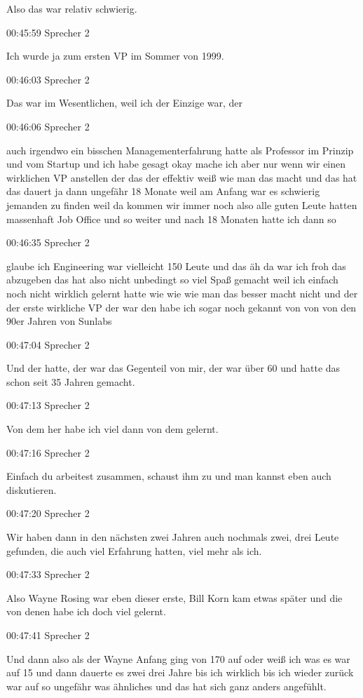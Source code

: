 Also das war relativ schwierig.

00:45:59 Sprecher 2

Ich wurde ja zum ersten VP im Sommer von 1999.

00:46:03 Sprecher 2

Das war im Wesentlichen, weil ich der Einzige war, der

00:46:06 Sprecher 2

auch irgendwo ein bisschen Managementerfahrung hatte als Professor im
Prinzip und vom Startup und ich habe gesagt okay mache ich aber nur wenn
wir einen wirklichen VP anstellen der das der effektiv weiß wie man das
macht und das hat das dauert ja dann ungefähr 18 Monate weil am Anfang
war es schwierig jemanden zu finden weil da kommen wir immer noch also
alle guten Leute hatten massenhaft Job Office und so weiter und nach 18
Monaten hatte ich dann so

00:46:35 Sprecher 2

glaube ich Engineering war vielleicht 150 Leute und das äh da war ich
froh das abzugeben das hat also nicht unbedingt so viel Spaß gemacht
weil ich einfach noch nicht wirklich gelernt hatte wie wie wie man das
besser macht nicht und der der erste wirkliche VP der war den habe ich
sogar noch gekannt von von von den 90er Jahren von Sunlabs

00:47:04 Sprecher 2

Und der hatte, der war das Gegenteil von mir, der war über 60 und hatte
das schon seit 35 Jahren gemacht.

00:47:13 Sprecher 2

Von dem her habe ich viel dann von dem gelernt.

00:47:16 Sprecher 2

Einfach du arbeitest zusammen, schaust ihm zu und man kannst eben auch
diskutieren.

00:47:20 Sprecher 2

Wir haben dann in den nächsten zwei Jahren auch nochmals zwei, drei
Leute gefunden, die auch viel Erfahrung hatten, viel mehr als ich.

00:47:33 Sprecher 2

Also Wayne Rosing war eben dieser erste, Bill Korn kam etwas später und
die von denen habe ich doch viel gelernt.

00:47:41 Sprecher 2

Und dann also als der Wayne Anfang ging von 170 auf oder weiß ich was es
war auf 15 und dann dauerte es zwei drei Jahre bis ich wirklich bis ich
wieder zurück war auf so ungefähr was ähnliches und das hat sich ganz
anders angefühlt.

